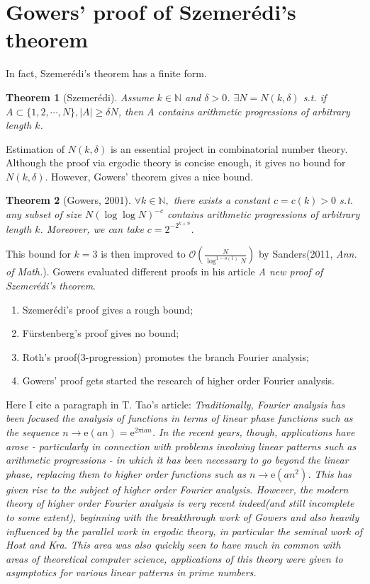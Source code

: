 \documentclass[12pt]{article}
\newtheorem{theorem}{Theorem}
\begin{document}
\section{Gowers' proof of Szemer\'edi's theorem}
In fact, Szemer\'edi's theorem has a finite form.
\begin{theorem}[Szemer\'edi]
Assume $k\in\mathbb N$ and $\delta>0$. $\exists N=N(k,\delta)$ s.t. if $A\subset\{1,2,\cdots,N \},|A|\ge \delta N$, then $A$ contains arithmetic progressions of arbitrary length $k$.
\end{theorem}
Estimation of $N(k,\delta)$ is an essential project in combinatorial number theory. Although the proof via ergodic theory is concise enough, it gives no bound for $N(k,\delta)$. However, Gowers' theorem  gives a nice bound.
\begin{theorem}[Gowers, 2001]
$\forall k\in \mathbb N,$ there exists a constant $c=c(k)>0$ s.t. any subset of size $N(\log\log N)^{-c}$ contains arithmetic progressions of arbitrary length $k$. Moreover, we can take $c=2^{-2^{k+9}}$.
\end{theorem}
This bound for $k=3$ is then improved to $\mathcal O\left(\frac{N}{\log^{1- o(1)}N} \right)$ by Sanders(2011, \textit{Ann. of Math.}). Gowers evaluated different proofs in his article \textit{A new proof of Szemer\'edi's theorem}.
\begin{enumerate}
	\item Szemer\'edi's proof gives a rough bound;
	\item F\"urstenberg's proof gives no bound;
	\item Roth's proof(3-progression) promotes the branch Fourier analysis;
	\item Gowers' proof gets started the research of higher order Fourier analysis.
\end{enumerate}
Here I cite a paragraph in T. Tao's article: \textit{Traditionally, Fourier analysis has been focused the analysis of functions in terms of linear phase functions such as the sequence $n\to \mathrm e(an)=\mathrm e^{2\pi \mathrm i an}$. In the recent years, though, applications have arose - particularly in connection with problems involving linear patterns such as arithmetic progressions - in which it has been necessary to go beyond the linear phase, replacing them to higher order functions such as $n\to \mathrm e(an^2)$. This has given rise to the subject of higher order Fourier analysis. However, the modern theory of higher order Fourier analysis is very recent indeed(and still incomplete to some extent), beginning with the breakthrough work of Gowers and also heavily influenced by the parallel work in ergodic theory, in particular the seminal work of Host and Kra. This area was also quickly seen to have much in common with areas of theoretical computer science, applications of this theory were given to asymptotics for various linear patterns in prime numbers.}
\end{document}
